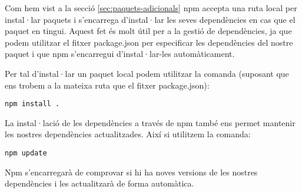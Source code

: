 Com hem vist a la secció \ref{sec:paquets-adicionals} npm accepta una ruta local per instal·lar paquets i s'encarrega d'instal·lar les seves dependències en cas que el paquet en tingui. Aquest fet és molt útil per a la gestió de dependències, ja que podem utilitzar el fitxer package.json per especificar les dependències del nostre paquet i que npm s'encarregui d'instal·lar-les automàticament. 

Per tal d'instal·lar un paquet local podem utilitzar la comanda (suposant que ens trobem a la mateixa ruta que el fitxer package.json): 

\begin{verbatim}
npm install . 
\end{verbatim}

La instal·lació de les dependències a través de npm també ens permet mantenir les nostres dependències actualitzades. Així si utilitzem la comanda: 

\begin{verbatim}
npm update
\end{verbatim}

Npm s'encarregarà de comprovar si hi ha noves versions de les nostres dependències i les actualitzarà de forma automàtica. 




